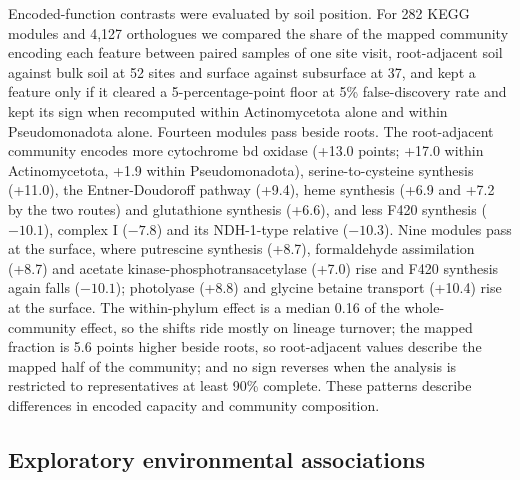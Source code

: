 Encoded-function contrasts were evaluated by soil position. For 282 KEGG modules and 4{,}127
orthologues we compared the share of the mapped community encoding each feature between paired
samples of one site visit, root-adjacent soil against bulk soil at 52 sites and surface against
subsurface at 37, and kept a feature only if it cleared a 5-percentage-point floor at 5\%
false-discovery rate and kept its sign when recomputed within Actinomycetota alone and within
Pseudomonadota alone. Fourteen modules pass beside roots. The root-adjacent community encodes more
cytochrome bd oxidase (+13.0 points; +17.0 within Actinomycetota, +1.9 within Pseudomonadota),
serine-to-cysteine synthesis (+11.0), the Entner-Doudoroff pathway (+9.4), heme synthesis (+6.9 and
+7.2 by the two routes) and glutathione synthesis (+6.6), and less F420 synthesis ($-10.1$), complex I
($-7.8$) and its NDH-1-type relative ($-10.3$).
Nine modules pass at
the surface, where putrescine synthesis (+8.7), formaldehyde assimilation (+8.7) and acetate
kinase-phosphotransacetylase (+7.0) rise and F420 synthesis again falls ($-10.1$); photolyase
(+8.8) and glycine betaine transport (+10.4) rise at the surface. The within-phylum effect is a
median 0.16 of the whole-community effect, so the shifts ride mostly on lineage turnover; the mapped
fraction is 5.6 points higher beside roots, so root-adjacent values describe the mapped half of the
community; and no sign reverses when the analysis is restricted to representatives at least 90\%
complete. These patterns describe differences in encoded capacity and community composition.

\subsection*{Exploratory environmental associations}

